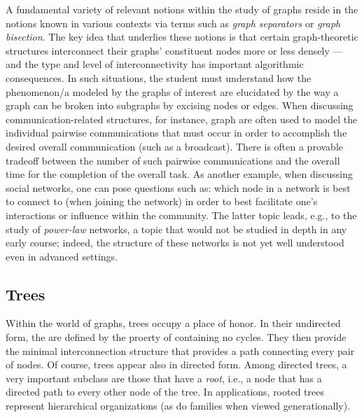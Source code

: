 A fundamental variety of relevant notions within the study of graphs
reside in the notions known in various contexts via terms such as {\em
  graph separators} or {\em graph bisection}.  The key idea that
underlies these notions is that certain graph-theoretic structures
interconnect their graphs' constituent nodes more or less densely ---
and the type and level of interconnectivity has important algorithmic
consequences.  In such situations, the student must understand how the
phenomenon/a modeled by the graphs of interest are elucidated by the
way a graph can be broken into subgraphs by excising nodes or edges.
When discussing communication-related structures, for instance, graph
are often used to model the individual pairwise communications that
must occur in order to accomplish the desired overall communication
(such as a broadcast).  There is often a provable tradeoff between the
number of such pairwise communications and the overall time for the
completion of the overall task.  As another example, when discussing
social networks, one can pose questions such as: which node in a
network is best to connect to (when joining the network) in order to
best facilitate one's interactions or influence within the community.
The latter topic leads, e.g., to the study of {\em power-law}
networks, a topic that would not be studied in depth in any early
course; indeed, the structure of these networks is not yet well
understood even in advanced settings.

\subsection{Trees}

Within the world of graphs, trees occupy a place of honor.  In their
undirected form, the are defined by the proerty of containing no
cycles.  They then provide the minimal interconnection structure that
provides a path connecting every pair of nodes.  Of course, trees
appear also in directed form.  Among directed trees, a very important
subclass are those that have a {\em root}, i.e., a node that has a
directed path to every other node of the tree.  In applications,
rooted trees represent hierarchical organizations (as do families when
viewed generationally).

